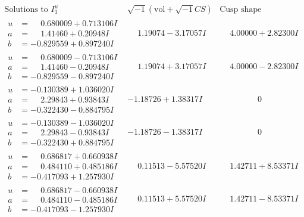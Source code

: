 \documentclass[1p]{elsarticle_modified}
\theoremstyle{definition}
\newcommand{\I}{\sqrt{-1}}
\begin{document}
$$\begin{array}{c|c|c}  
\text{Solutions to }I^u_{1}& \I (\text{vol} + \sqrt{-1}CS) & \text{Cusp shape}\\
 \hline 
\begin{aligned}
u &= \phantom{-}0.680009 + 0.713106 I \\
a &= \phantom{-}1.41460 + 0.20948 I \\
b &= -0.829559 + 0.897240 I\end{aligned}
 & \phantom{-}1.19074 - 3.17057 I & \phantom{-}4.00000 + 2.82300 I \\ \hline\begin{aligned}
u &= \phantom{-}0.680009 - 0.713106 I \\
a &= \phantom{-}1.41460 - 0.20948 I \\
b &= -0.829559 - 0.897240 I\end{aligned}
 & \phantom{-}1.19074 + 3.17057 I & \phantom{-}4.00000 - 2.82300 I \\ \hline\begin{aligned}
u &= -0.130389 + 1.036020 I \\
a &= \phantom{-}2.29843 + 0.93843 I \\
b &= -0.322430 - 0.884795 I\end{aligned}
 & -1.18726 + 1.38317 I & \phantom{-0.000000 } 0 \\ \hline\begin{aligned}
u &= -0.130389 - 1.036020 I \\
a &= \phantom{-}2.29843 - 0.93843 I \\
b &= -0.322430 + 0.884795 I\end{aligned}
 & -1.18726 - 1.38317 I & \phantom{-0.000000 } 0 \\ \hline\begin{aligned}
u &= \phantom{-}0.686817 + 0.660938 I \\
a &= \phantom{-}0.484110 + 0.485186 I \\
b &= -0.417093 + 1.257930 I\end{aligned}
 & \phantom{-}0.11513 - 5.57520 I & \phantom{-}1.42711 + 8.53371 I \\ \hline\begin{aligned}
u &= \phantom{-}0.686817 - 0.660938 I \\
a &= \phantom{-}0.484110 - 0.485186 I \\
b &= -0.417093 - 1.257930 I\end{aligned}
 & \phantom{-}0.11513 + 5.57520 I & \phantom{-}1.42711 - 8.53371 I \\ \hline\begin{aligned}

\end{aligned}
\end{array}$$
\end{document}
